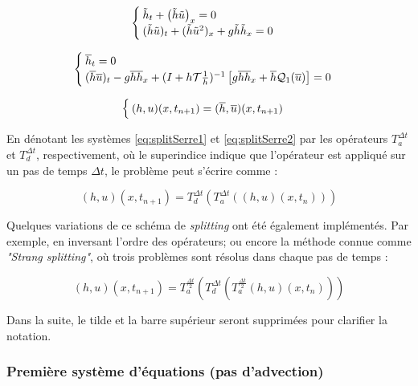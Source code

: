 \begin{equation}
	\label{eq:splitSerre1}
	\begin{cases}
		\tilde{h}_t + \left(\tilde{h}\tilde{u}\right)_x = 0 \\
		(\tilde{h}\tilde{u})_t + (\tilde{h}\tilde{u}^2)_x + g\tilde{h}\tilde{h}_x = 0 
	\end{cases}	
\end{equation}

\begin{equation}
	\label{eq:splitSerre2}
	\begin{cases}
		\overline{h}_t = 0 \\
		(\overline{h}\overline{u})_t  -g\overline{h}\overline{h}_x + (I + h\mathcal{T}\frac{1}{h})^{-1}\left[ g\overline{h}\overline{h}_x + \overline{h}\mathcal{Q}_1(\overline{u}) \right] = 0
	\end{cases}	
\end{equation}

\begin{equation*}
\begin{cases}
(h,u)(x,t_{n+1}) = (\overline{h},\overline{u})(x,t_{n+1})
\end{cases}
\end{equation*}

\indent En dénotant les systèmes \eqref{eq:splitSerre1} et  \eqref{eq:splitSerre2} par les opérateurs $T_a^{\Delta t}$ et $T_d^{\Delta t}$, respectivement, où le superindice indique que l'opérateur est appliqué sur un pas de temps  $\Delta t$, le problème peut s'écrire comme :

\begin{equation*}
(h,u)(x,t_{n+1}) = T_d^{\Delta t} \left( T_a^{\Delta t} \left((h,u)(x,t_n) \right) \right)
\end{equation*}

\indent Quelques variations de ce schéma de \emph{splitting} ont été également implémentés. Par exemple, en inversant l'ordre des opérateurs; ou encore la méthode connue comme \emph{"Strang splitting"}, où trois problèmes sont résolus dans chaque pas de temps :

\begin{equation*}
(h,u)(x,t_{n+1}) = T_a^{\frac{\Delta t}{2}} \left( T_d^{\Delta t} \left( T_a^{\frac{\Delta t}{2}} (h,u)(x,t_n) \right) \right)
\end{equation*}

\indent Dans la suite, le tilde et la barre supérieur seront supprimées pour clarifier la notation.

\subsubsection{Première système d'équations (pas d'advection)}

